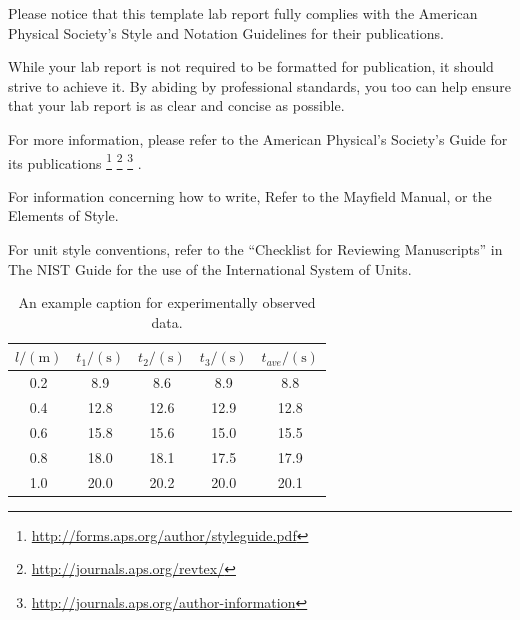 \documentclass[
    10pt,aps,prl,
    amsfonts,
    amssymb,
    amsmath,
    draft,
    runinaddress,
    secnum,
    showkeys,
    superscriptaddress,
    twocolumn,
]{revtex4}
\begin{document}
    Please notice that this template lab report fully complies
        with the American Physical Society's Style and Notation
        Guidelines for their publications.

    While your lab report is not required to be formatted for publication,
        it should strive to achieve it.
    By abiding by professional standards, you too can help ensure
        that your lab report is as clear and concise as possible.
   
    For more information, please refer to the American Physical's
        Society's Guide for its publications
    \footnote{\url{http://forms.aps.org/author/styleguide.pdf}}
    \footnote{\url{http://journals.aps.org/revtex/}}
    \footnote{\url{http://journals.aps.org/author-information}}
    \cite{Simon:2010:SIGCSE}
    \cite{PeerInstruction}.

    For information concerning how to write,
        Refer to the Mayfield Manual\cite{Mayfield},
        or the Elements of Style\cite{StrunkWilliam}.

    For unit style conventions, refer to the ``Checklist for Reviewing Manuscripts''
        in The NIST Guide for the use of the International System of Units\cite{NISTsp811}.

    \begin{table}[h]
        \begin{ruledtabular}
        \begin{tabular}{c|ccc|c}
            $l/(\si{\meter})$ &
            $t_1/(\si{\second})$ &
            $t_2/(\si{\second})$ &
            $t_3/(\si{\second})$ &
            $t_{ave}/(\si{\second})$ \\
            \hline
            0.2 &  8.9 &  8.6 &  8.9 &  8.8 \\
            0.4 & 12.8 & 12.6 & 12.9 & 12.8 \\
            0.6 & 15.8 & 15.6 & 15.0 & 15.5 \\
            0.8 & 18.0 & 18.1 & 17.5 & 17.9 \\
            1.0 & 20.0 & 20.2 & 20.0 & 20.1 \\
        \end{tabular}
        \end{ruledtabular}
        \caption{An example caption for experimentally observed data.}
        \label{tab:data}
    \end{table}
\end{document}
